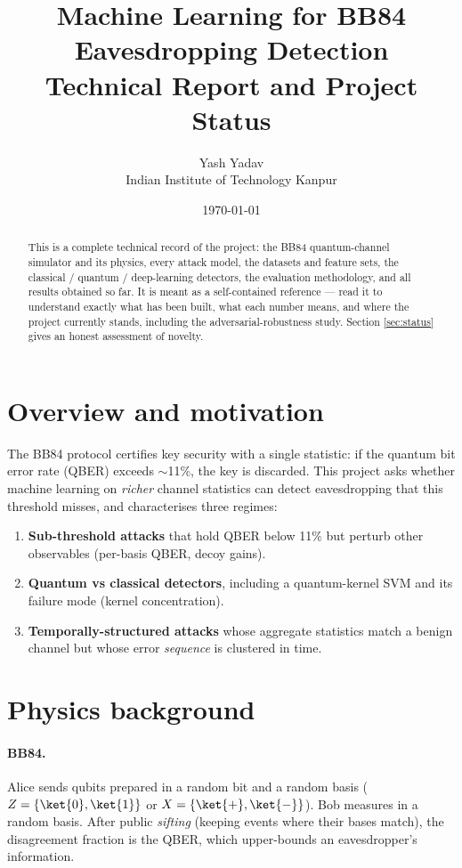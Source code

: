 \documentclass[11pt]{article}
\title{\textbf{Machine Learning for BB84 Eavesdropping Detection\\
\large Technical Report and Project Status}}
\author{Yash Yadav \\ \small Indian Institute of Technology Kanpur}
\date{\today}
\begin{document}
\maketitle

\begin{abstract}
This is a complete technical record of the project: the BB84 quantum-channel
simulator and its physics, every attack model, the datasets and feature sets, the
classical / quantum / deep-learning detectors, the evaluation methodology, and all
results obtained so far. It is meant as a self-contained reference --- read it to
understand exactly what has been built, what each number means, and where the
project currently stands, including the adversarial-robustness study. Section
\ref{sec:status} gives an honest assessment of novelty.
\end{abstract}

\tableofcontents

\section{Overview and motivation}
The BB84 protocol certifies key security with a single statistic: if the quantum
bit error rate (QBER) exceeds $\sim$11\%, the key is discarded. This project asks
whether machine learning on \emph{richer} channel statistics can detect
eavesdropping that this threshold misses, and characterises three regimes:
\begin{enumerate}
  \item \textbf{Sub-threshold attacks} that hold QBER below 11\% but perturb other
  observables (per-basis QBER, decoy gains).
  \item \textbf{Quantum vs classical detectors}, including a quantum-kernel SVM and
  its failure mode (kernel concentration).
  \item \textbf{Temporally-structured attacks} whose aggregate statistics match a
  benign channel but whose error \emph{sequence} is clustered in time.
\end{enumerate}

\section{Physics background}
\paragraph{BB84.} Alice sends qubits prepared in a random bit and a random basis
($Z=\{\ket{0},\ket{1}\}$ or $X=\{\ket{+},\ket{-}\}$). Bob measures in a random
basis. After public \emph{sifting} (keeping events where their bases match), the
disagreement fraction is the QBER, which upper-bounds an eavesdropper's
information.
\end{document}
